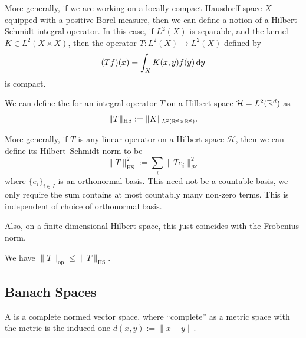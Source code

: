 \begin{remark}
More generally, if we are working on a locally compact Hausdorff space
$X$ equipped with a positive Borel measure, then we can define a
notion of a Hilbert--Schmidt integral operator. In this case, if
$L^{2}(X)$ is separable, and the kernel $K\in L^{2}(X\times X)$, then
the operator $T\colon L^{2}(X)\to L^{2}(X)$ defined by
\begin{equation}
(Tf)(x)=\int_{X}K(x,y)f(y)\,\mathrm{d} y
\end{equation}
is compact.
\end{remark}

\begin{definition}
We can define the  for an integral
operator $T$ on a Hilbert space $\mathcal{H}=L^{2}(\mathbb{R}^{d})$ as
\begin{equation}
\|T\|_{\text{HS}}:=\|K\|_{L^{2}(\mathbb{R}^{d}\times\mathbb{R}^{d})}.
\end{equation}
\end{definition}

\begin{remark}
More generally, if $T$ is any linear operator on a Hilbert space
$\mathcal{H}$, then we can define its Hilbert--Schmidt norm to be
\begin{equation}
\|T\|_{\text{HS}}^{2}:=\sum_{i}\|Te_{i}\|_{\mathcal{H}}^{2}
\end{equation}
where $\{e_{i}\}_{i\in I}$ is an orthonormal basis. This need not be a
countable basis, we only require the sum contains at most countably
many non-zero terms. This is independent of choice of orthonormal basis.

Also, on a finite-dimensional Hilbert space, this just coincides with
the Frobenius norm.
\end{remark}

\begin{fact}
We have $\|T\|_{\text{op}}\leq\|T\|_{\text{HS}}$.
\end{fact}

\subsection{Banach Spaces}

\begin{definition}
A  is a complete normed vector space, where
``complete'' as a metric space with the metric is the induced one $d(x,y):=\|x-y\|$.
\end{definition}

